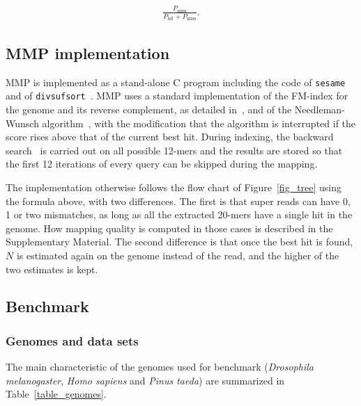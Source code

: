 \documentclass[a4,center,fleqn]{NAR}
\begin{document}
\begin{align}
\label{eq_low}
\frac{P_{\text{miss}}}{P_{\text{hit}} + P_{\text{miss}}}.
\end{align}


\subsection{MMP implementation}

MMP is implemented as a stand-alone C program including the code of
\texttt{sesame}~\cite{Filion619155} and of
\texttt{divsufsort}~\cite{fischer2017dismantling}. MMP uses a standard
implementation of the FM-index for the genome and its reverse complement,
as detailed in~\cite{blog}, and of the Needleman-Wunsch
algorithm~\cite{pmid5420325}, with the modification that the algorithm is
interrupted if the score rises above that of the current best hit. During
indexing, the backward search~\cite{ferragina2000opportunistic} is carried
out on all possible 12-mers and the results are stored so that the first
12 iterations of every query can be skipped during the mapping.

The implementation otherwise follows the flow chart of
Figure~\ref{fig_tree} using the formula above, with two differences.
The first is that super reads can have 0, 1 or two mismatches, as long as
all the extracted 20-mers have a single hit in the genome. How mapping
quality is computed in those cases is described in the Supplementary
Material. The second difference is that once the best hit is found, $N$ is
estimated again on the genome instead of the read, and the higher of the
two estimates is kept.

\subsection{Benchmark}

\subsubsection{Genomes and data sets}

The main characteristic of the genomes used for benchmark
(\textit{Drosophila melanogaster}, \textit{Homo sapiens} and \textit{Pinus
taeda}) are summarized in Table~\ref{table_genomes}.

\begin{table}[b]
{}
\end{table}
\end{document}
